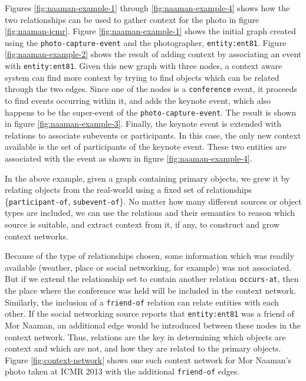 Figures \ref{fig:naaman-example-1} through \ref{fig:naaman-example-4} shows how the two relationships can be used to gather context for the photo in figure \ref{fig:naaman-icmr}. Figure \ref{fig:naaman-example-1} shows the initial graph created using the \texttt{photo-capture-event} and the photographer, \texttt{entity:ent81}. Figure \ref{fig:naaman-example-2} shows the result of adding context by associating an event with \texttt{entity:ent81}. Given this new graph with three nodes, a context aware system can find more context by trying to find objects which can be related through the two edges. Since one of the nodes is a \texttt{conference} event, it proceeds to find events occurring within it, and adds the keynote event, which also happens to be the super-event of the \texttt{photo-capture-event}. The result is shown in figure \ref{fig:naaman-example-3}. Finally, the keynote event is extended with relations to associate subevents or participants. In this case, the only new context available is the set of participants of the keynote event. These two entities are associated with the event as shown in figure \ref{fig:naaman-example-4}. 

In the above example, given a graph containing primary objects, we grew it by relating objects from the real-world using a fixed set of relationships \{\texttt{participant-of}, \texttt{subevent-of}\}. No matter how many different sources or object types are included, we can use the relations and their semantics to reason which source is suitable, and extract context from it, if any, to construct and grow context networks. 

Because of the type of relationships chosen, some information which was readily available (weather, place or social networking, for example) was not associated. But if we extend the relationship set to contain another relation \texttt{occurs-at}, then the place where the conference was held will be included in the context network. Similarly, the inclusion of a \texttt{friend-of} relation can relate entities with each other. If the social networking source reports that \texttt{entity:ent81} was a friend of Mor Naaman, an additional edge would be introduced between these nodes in the context network. Thus, relations are the key in determining which objects are context and which are not, and how they are related to the primary objects. Figure \ref{fig:context-network} shows one such context network for Mor Naaman's photo taken at ICMR 2013 with the additional \texttt{friend-of} edges.

